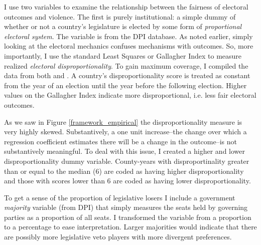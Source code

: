 \documentclass[a4paper]{article}\usepackage{graphicx, color}
\begin{document}
I use two variables to examine the relationship between the fairness of electoral outcomes and violence. The first is purely institutional: a simple dummy of whether or not a country's legislature is elected by some form of {\emph{proportional electoral system}}. The variable is from the DPI database. As noted earlier, simply looking at the electoral mechanics confuses mechanisms with outcomes. So, more importantly, I use the standard Least Squares or Gallagher Index \citep[see][]{Gallagher1991} to measure realized {\emph{electoral disproportionality}}. To gain maximum coverage, I compiled the data from both \cite{Gallagher2012} and \cite{Carey2011}. A country's disproportionality score is treated as constant from the year of an election until the year before the following election. Higher values on the Gallagher Index indicate more disproportional, i.e. less fair electoral outcomes. 

As we saw in Figure \ref{framework_empirical} the disproportionality measure is very highly skewed. Substantively, a one unit increase--the change over which a regression coefficient estimates there will be a change in the outcome--is not substantively meaningful. To deal with this issue, I created a higher and lower disproportionality dummy variable. County-years with disproportinality greater than or equal to the median (6) are coded as having higher disproportionality and those with scores lower than 6 are coded as having lower disproportionality.

To get a sense of the proportion of legislative losers I include a government {\emph{majority}} variable (from DPI) that simply measures the seats held by governing parties as a proportion of all seats. I transformed the variable from a proportion to a percentage to ease interpretation. Larger majorities would indicate that there are possibly more legislative veto players with more divergent preferences. 
\end{document}
